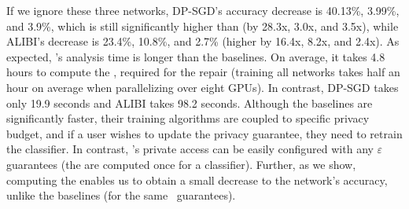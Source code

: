 {If we ignore these three networks, DP-SGD's accuracy decrease is 40.13\%, 3.99\%, and 3.9\%, which is still significantly higher than \tool (by 28.3x, 3.0x, and 3.5x), while ALIBI's decrease is 23.4\%, 10.8\%, and 2.7\% (higher by 16.4x, 8.2x, and 2.4x). 
As expected, \tool's analysis time is longer than the baselines. On average, it takes 4.8 hours to compute the \propa, required for the repair (training all networks takes half an hour on average when parallelizing over eight GPUs). 
In contrast, DP-SGD takes only 19.9 seconds and ALIBI takes 98.2 seconds. 
Although the baselines are significantly faster, their training algorithms are coupled to specific privacy budget, and if a user wishes to update the privacy guarantee, they need to retrain the classifier. In contrast, \tool's private access can be easily configured with any $\varepsilon$ guarantees (the \propa are computed once for a classifier).
Further, as we show, computing the \propa enables us to obtain a small decrease to the network's accuracy, unlike the baselines (for the same ~\propi guarantees).

}













